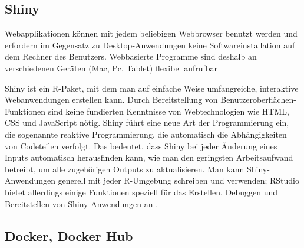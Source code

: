 \documentclass[12pt,a4paper]{article}
\begin{document}
\subsection{Shiny}

Webapplikationen können mit jedem beliebigen Webbrowser benutzt werden und erfordern im Gegensatz zu Desktop-Anwendungen keine Softwareinstallation auf dem Rechner des Benutzers. 
Webbasierte Programme sind deshalb an verschiedenen Geräten (Mac, Pc, Tablet) flexibel aufrufbar \cite{.03.03.2022b}

Shiny ist ein R-Paket, mit dem man auf einfache Weise umfangreiche, interaktive Webanwendungen erstellen kann. Durch Bereitstellung von Benutzeroberflächen-Funktionen sind keine fundierten Kenntnisse von Webtechnologien wie HTML, CSS und JavaScript nötig. Shiny führt eine neue Art der Programmierung ein, die sogenannte reaktive Programmierung, die automatisch die Abhängigkeiten von Codeteilen verfolgt. Das bedeutet, dass Shiny bei jeder Änderung eines Inputs automatisch herausfinden kann, wie man den geringsten Arbeitsaufwand betreibt, um alle zugehörigen Outputs zu aktualisieren. Man kann Shiny-Anwendungen generell mit jeder R-Umgebung schreiben und verwenden; RStudio bietet allerdings einige Funktionen speziell für das Erstellen, Debuggen und Bereitstellen von Shiny-Anwendungen an \cite{Wickham.22.03.2022}. 







\subsection{Docker, Docker Hub}
\end{document}
